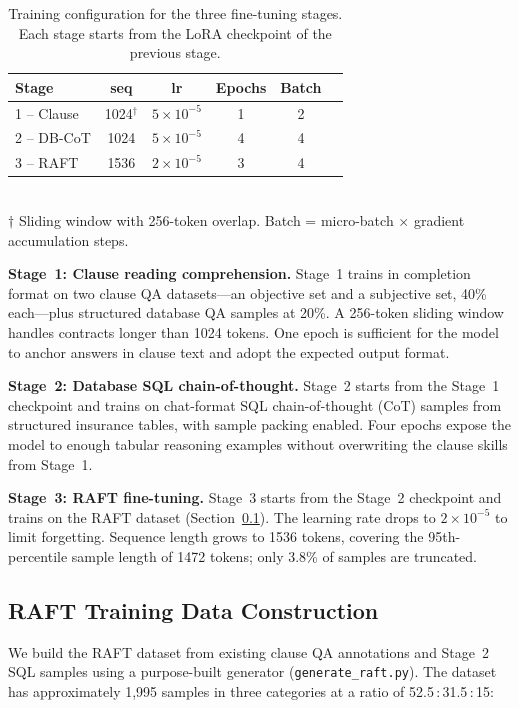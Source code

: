 \documentclass[10pt,conference]{IEEEtran}
\begin{document}
\begin{table}[htbp]
\centering
\caption{Training configuration for the three fine-tuning stages.
Each stage starts from the LoRA checkpoint of the previous stage.}
\label{tab:stages}
\small
\begin{tabular}{@{}lccccc@{}}
\toprule
Stage & seq & lr & Epochs & Batch \\
\midrule
1 -- Clause  & 1024$^\dagger$ & $5{\times}10^{-5}$ & 1 & 2 \\
2 -- DB-CoT  & 1024          & $5{\times}10^{-5}$ & 4 & 4 \\
3 -- RAFT    & 1536          & $2{\times}10^{-5}$ & 3 & 4 \\
\bottomrule
\end{tabular}\\[2pt]
{\footnotesize $\dagger$ Sliding window with 256-token overlap.
Batch = micro-batch $\times$ gradient accumulation steps.}
\end{table}

\noindent\textbf{Stage~1: Clause reading comprehension.}
Stage~1 trains in completion format on two clause QA datasets---an objective
set and a subjective set, 40\% each---plus structured database QA samples at
20\%.
A 256-token sliding window handles contracts longer than 1024 tokens.
One epoch is sufficient for the model to anchor answers in clause text and
adopt the expected output format.

\noindent\textbf{Stage~2: Database SQL chain-of-thought.}
Stage~2 starts from the Stage~1 checkpoint and trains on chat-format SQL
chain-of-thought (CoT) samples from structured insurance tables, with sample
packing enabled.
Four epochs expose the model to enough tabular reasoning examples without
overwriting the clause skills from Stage~1.

\noindent\textbf{Stage~3: RAFT fine-tuning.}
Stage~3 starts from the Stage~2 checkpoint and trains on the RAFT dataset
(Section~\ref{sec:raft_data}).
The learning rate drops to $2{\times}10^{-5}$ to limit forgetting.
Sequence length grows to 1536 tokens, covering the 95th-percentile sample
length of 1472 tokens; only 3.8\% of samples are truncated.

\subsection{RAFT Training Data Construction}
\label{sec:raft_data}

We build the RAFT dataset from existing clause QA annotations and Stage~2 SQL
samples using a purpose-built generator (\texttt{generate\_raft.py}).
The dataset has approximately 1,995 samples in three categories at a ratio of
52.5\,:\,31.5\,:\,15:
\end{document}
